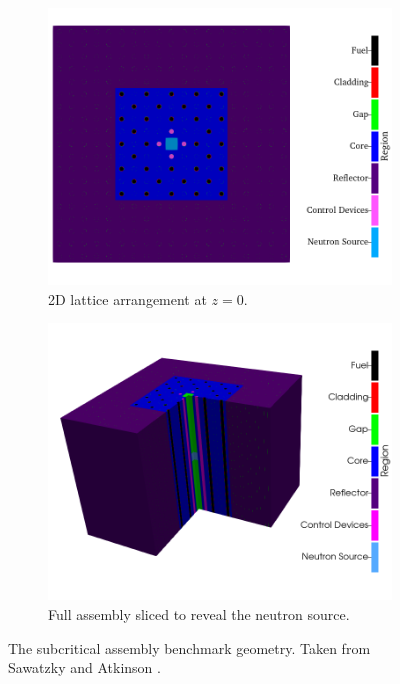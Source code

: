 \begin{figure}[H]
    \centering
    \begin{subfigure}[b]{0.48\textwidth}
        \centering
        \includegraphics[width=\textwidth]{images/verification/subcritical/geo/subcritical_regions.png}
        \caption{2D lattice arrangement at $z = 0$.}
        \label{fig:subcritical_geo:2D_lattice}
    \end{subfigure}
    \hfill
    \begin{subfigure}[b]{0.48\textwidth}
        \centering
        \includegraphics[width=\textwidth]{images/verification/subcritical/geo/3D_subcritical_regions.png}
        \caption{Full assembly sliced to reveal the neutron source.}
        \label{fig:subcritical_geo:full_geometry}
    \end{subfigure}
    \hfill
    \caption[The subcritical assembly benchmark geometry.]{The subcritical assembly benchmark geometry. Taken from Sawatzky and Atkinson \cite{ks_2024_subcritical}.}
    \label{fig:subcritical_geo}
\end{figure}

